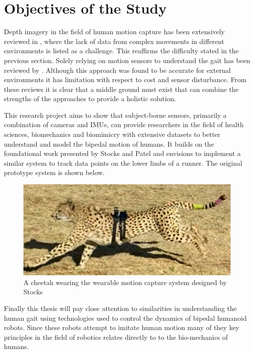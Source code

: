   
\section{Objectives of the Study}
Depth imagery in the field of human motion capture has been extensively reviewed in \cite{chen2013survey}, where the lack of data from complex movements in different environments is listed as a challenge. This reaffirms the difficulty stated in the previous section.  Solely relying on motion sensors to understand the gait has been reviewed by \cite{picerno201725}. Although this approach was found to be accurate for external environments it has limitation with respect to cost and sensor disturbance. From these reviews it is clear that a middle ground must exist that can combine the strengths of the approaches to provide a holistic solution.

This research project aims to show that subject-borne sensors, primarily a combination of cameras and IMUs, can provide researchers in the field of health sciences, biomechanics and biomimicry with extensive datasets to better understand and model the bipedal motion of humans. It builds on the foundational work presented by Stocks and Patel \cite{bradstocks} and envisions to implement a similar system to track data points on the lower limbs of a runner. The original prototype system is shown below.

\begin{figure}[!ht] 
\captionsetup{width=0.8\linewidth, font=small}  
\includegraphics[width=0.8\linewidth]{figures/introcheetah.png}
\caption{A cheetah wearing the wearable motion capture system designed by Stocks \cite{bradstocks}}
\label{fig:introcheetah}
\end{figure}

Finally this thesis will pay close attention to similarities in understanding the human gait using technologies used to control the dynamics of bipedal humanoid robots. Since these robots attempt to imitate human motion many of they key principles in the field of robotics relates directly to to the bio-mechanics of humans.

